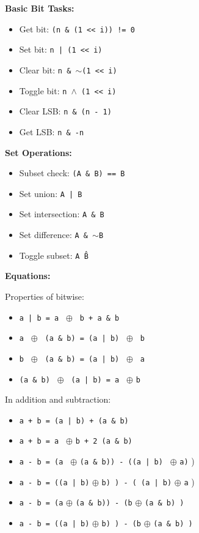 \documentclass[letterpaper,landscape]{article}
\begin{document}
\noindent\textbf{Basic Bit Tasks:}

\begin{itemize}
    \item Get bit: \texttt{(n \& (1 << i)) != 0}
    \item Set bit: \texttt{n | (1 << i)}
    \item Clear bit: \texttt{n \& $\sim$(1 << i)}
    \item Toggle bit: \texttt{n $\wedge$ (1 << i)}
    \item Clear LSB: \texttt{n \& (n - 1)}
    \item Get LSB: \texttt{n \& -n}
\end{itemize}

\noindent\textbf{Set Operations:}

\begin{itemize}
    \item Subset check: \texttt{(A \& B) == B}
    \item Set union: \texttt{A | B}
    \item Set intersection: \texttt{A \& B}
    \item Set difference: \texttt{A \& $\sim$B}
    \item Toggle subset: \texttt{A \^ B}
\end{itemize}

\noindent\textbf{Equations:}\par\vspace{0.5\baselineskip}

Properties of bitwise:
\begin{itemize}
  \item \texttt{a | b = a } $\oplus$ \texttt{ b + a \& b}
  \item \texttt{a } $\oplus$ \texttt{ (a \& b) = (a | b) } $\oplus$ \texttt{ b} 
  \item \texttt{b } $\oplus$ \texttt{ (a \& b) = (a | b) } $\oplus$ \texttt{ a} 
  \item \texttt{(a \& b) } $\oplus$ \texttt{ (a | b) = a } $\oplus$ \texttt{b}
\end{itemize}

In addition and subtraction:
\begin{itemize}
  \item \texttt{a + b = (a | b) + (a \& b)}
  \item \texttt{a + b = a } $\oplus$ \texttt{b + 2 (a \& b)}
  \item \texttt{a - b = (a } $\oplus$ \texttt{(a \& b)) - ((a | b) } $\oplus$ \texttt{a)} )
  \item \texttt{a - b = ((a | b)} $\oplus$ \texttt{b) ) - ( (a | b)} $\oplus$ \texttt{a} )
  \item \texttt{a - b = (a} $\oplus$ \texttt{(a \& b)) - (b} $\oplus$ \texttt{(a \& b) )}
  \item \texttt{a - b = ((a | b)} $\oplus$ \texttt{b) ) - (b} $\oplus$ \texttt{(a \& b) )}
\end{itemize}
\end{document}
